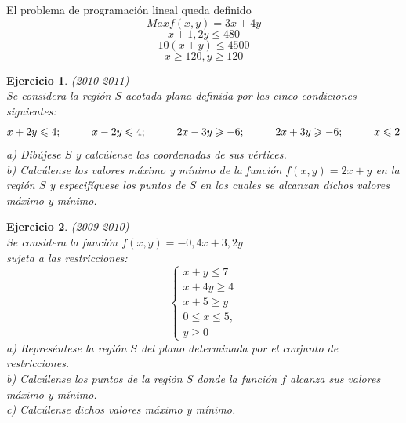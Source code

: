 \documentclass[12pt, a4paper]{amsart}
\newtheorem{ejer}{Ejercicio}
\newcommand{\s}{\color[rgb]{0,0,0.5}}
\newcommand{\n}{\color[rgb]{0,0,0}}
\begin{document}
El problema de programación lineal queda definido
\[Max f(x,y)= 3x+4y\]
\[x+1,2y\leqslant 480\]
\[10(x+y)\leqslant 4500\]
\[x\geqslant 120, y\geqslant 120\]







\n

\begin{ejer}\em (2010-2011)\\
Se considera la región $S$ acotada plana definida por las cinco condiciones siguientes:
\[x+2y\leqslant 4;\hspace*{1cm} x-2y\leqslant 4;\hspace*{1cm} 2x-3y\geqslant -6;\hspace*{1cm} 2x+3y\geqslant -6;\hspace*{1cm} x\leqslant 2\]
a) Dibújese $S$ y calcúlense las coordenadas de sus vértices.\\
b) Calcúlense los valores máximo y mínimo de la función $f(x,y)=2x+y$ en la región $S$ y especifíquese los puntos de $S$ en los cuales se alcanzan dichos valores máximo y mínimo.
\end{ejer}



\begin{ejer}\em (2009-2010)\\
Se considera la función $f(x,y)=-0,4x+3,2y$\\
sujeta a las restricciones: \[\left \{ \begin{matrix}
x+y\leq 7
\\ x+4y\geq 4
\\ x+5\geq y\\
0\leq x\leq 5,\\
 y\geq 0
\end{matrix}\right.\]
a) Represéntese la región $S$ del plano determinada por el conjunto de restricciones.\\
b) Calcúlense los puntos de la región $S$ donde la función $f$ alcanza sus valores máximo y mínimo.\\
c) Calcúlense dichos valores máximo y mínimo.
\end{ejer}
\s

\n
\end{document}
